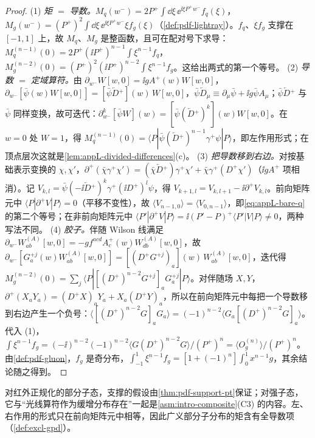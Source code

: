 \begin{proof}
(1) \emph{矩 $=$ 导数。}$M_q(w^-)=2P^+\int\dd\xi\,\ee^{\ii\xi P^+w^-}f_q(\xi)$，$M_g(w^-)=(P^+)^2\int\dd\xi\,\ee^{\ii\xi P^+w^-}\xi f_g(\xi)$（\cref{def:pdf-lightray}）。$f_q$、$\xi f_g$ 支撑在 $[-1,1]$ 上，故 $M_q$、$M_g$ 是整函数\cite[定理~7.3.1]{Hormander2003}，且可在配对号下求导：$M_q^{(n-1)}(0)=2P^+(\ii P^+)^{n-1}\int\xi^{n-1}f_q$，$M_g^{(n-2)}(0)=(P^+)^2(\ii P^+)^{n-2}\int\xi^{n-1}f_g$。这给出两式的第一个等号。
(2) \emph{导数 $=$ 定域算符。}由 $\partial_{w^-}W[w,0]=\ii gA^+(w)W[w,0]$，$\partial_{w^-}[\bar\psi(w)W[w,0]]=[\bar\psi\overleftarrow{D}{}^+](w)\,W[w,0]$，$\bar\psi\overleftarrow{D}_\mu\equiv\partial_\mu\bar\psi+\ii g\bar\psi A_\mu$；$\bar\psi\overleftarrow{D}{}^+$ 与 $\bar\psi$ 同样变换，故可迭代：$\partial^k_{w^-}[\bar\psi W](w)=[\bar\psi(\overleftarrow{D}{}^+)^k](w)W[w,0]$。在 $w=0$ 处 $W=1$，得 $M_q^{(n-1)}(0)=\langle P|\bar\psi(\overleftarrow{D}{}^+)^{n-1}\gamma^+\psi|P\rangle$，即左作用形式；在顶点层次这就是\cref{lem:appL-divided-differences}(c)。
(3) \emph{把导数移到右边。}对按基础表示变换的 $\chi,\chi'$，$\partial^+(\bar\chi\gamma^+\chi')=(\bar\chi\overleftarrow{D}{}^+)\gamma^+\chi'+\bar\chi\gamma^+(D^+\chi')$（$\ii gA^+$ 项相消）。记 $V_{k,l}=\bar\psi(-\ii\overleftarrow{D}{}^+)^k\gamma^+(\ii D^+)^l\psi$，得 $V_{k+1,l}=V_{k,l+1}-\ii\partial^+V_{k,l}$。前向矩阵元中 $\langle P|\partial^+V|P\rangle=0$（平移不变性），故 $\langle V_{n-1,0}\rangle=\langle V_{0,n-1}\rangle$，即\cref{eq:appL-bare-q}的第二个等号；在非前向矩阵元中 $\langle P'|\partial^+V|P\rangle=\ii(P'-P)^+\langle P'|V|P\rangle\ne0$，两种写法不同。
(4) \emph{胶子。}伴随 Wilson 线满足 $\partial_{w^-}W^{(A)}_{ab}[w,0]=-gf^{acd}A^+_c(w)W^{(A)}_{db}[w,0]$，故 $\partial_{w^-}[G^{+j}_a(w)W^{(A)}_{ab}[w,0]]=[(D^+G^{+j})_a](w)\,W^{(A)}_{ab}[w,0]$，迭代得 $M_g^{(n-2)}(0)=\sum_j\langle P|[(D^+)^{n-2}G^{+j}]_aG^{+j}_a|P\rangle$。对伴随场 $X,Y$，$\partial^+(X_aY_a)=(D^+X)_aY_a+X_a(D^+Y)_a$，所以在前向矩阵元中每把一个导数移到右边产生一个负号：$\langle[(D^+)^{n-2}G]_aG_a\rangle=(-1)^{n-2}\langle G_a[(D^+)^{n-2}G]_a\rangle$。代入 (1)，$\int\xi^{n-1}f_g=(-\ii)^{n-2}(-1)^{n-2}\langle G(D^+)^{n-2}G\rangle/(P^+)^n=\langle O^{(n)}_g\rangle/(P^+)^n$。由\cref{def:pdf-gluon}，$f_g$ 是奇分布，$\int_{-1}^1\xi^{n-1}f_g=[1+(-1)^n]\int_0^1x^{n-1}g$，其余结论随之得到。
\end{proof}

对红外正规化的部分子态，支撑的假设由\cref{thm:pdf-support-pt}保证；对强子态，它与“光线算符作为缓增分布存在”一起是\cref{asm:intro-composite}(C3) 的内容。左、右作用的形式只在前向矩阵元中相等，因此广义部分子分布的矩含有全导数项（\cref{def:excl-gpd}）。

